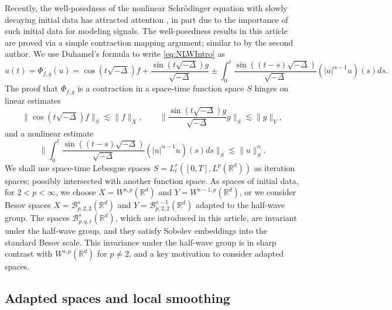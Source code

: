 \documentclass{amsart}
\theoremstyle{definition}
\newcommand{\R}{\mathbb{R}}
\newcommand {\Rd}{\mathbb{R}^{d}}
\newcommand {\Baspqr}{\mathcal{B}^{s}_{p,q,r}(\Rd)}
\numberwithin{equation}{section}
\begin{document}
Recently, the well-posedness of the nonlinear Schr\"odinger equation with slowly decaying initial data has attracted attention \cite{DodsonSofferSpencer2021,Schippa2022}, in part due to the importance of such initial data for modeling signals. The well-posedness results in this article are proved via a simple contraction mapping argument; similar to \cite{Schippa2022} by the second author. We use Duhamel's formula to write \eqref{eq:NLWIntro} as
\[
u(t) = \Phi_{f,g}(u) = \cos(t \sqrt{- \Delta}) f + \frac{\sin(t \sqrt{- \Delta}) g}{\sqrt{- \Delta}} \pm \int_0^t \frac{\sin((t-s) \sqrt{- \Delta})}{\sqrt{- \Delta}} (|u|^{\alpha - 1} u)(s) ds.
\]
The proof that $\Phi_{f,g}$ is a contraction in a space-time function space $S$ hinges on linear estimates
\[
\| \cos(t \sqrt{- \Delta}) f \|_S \lesssim \| f \|_X , \qquad \Big\| \frac{\sin (t \sqrt{- \Delta}) g}{\sqrt{- \Delta}} g \Big\|_S \lesssim \| g \|_Y,
\]
and a nonlinear estimate
\[
\Big\| \int_0^t \frac{\sin((t-s) \sqrt{- \Delta})}{\sqrt{ - \Delta}} (|u|^{\alpha -1} u)(s) ds \Big\|_S \lesssim \| u \|_S^\alpha.
\]
We shall use space-time Lebesgue spaces $S = L_t^r([0,T],L^p(\R^d))$ as iteration spaces; possibly intersected with another function space. As spaces of initial data, for $2<p<\infty$, we choose $X = W^{s,p}(\R^d)$ and $Y = W^{s-1,p}(\R^d)$, or we consider Besov spaces $X = \mathcal{B}^{s}_{p,2,2}(\R^d)$ and $Y = \mathcal{B}^{s-1}_{p,2,2}(\R^d)$ adapted to the half-wave group. The spaces $\Baspqr$, which are introduced in this article, are invariant under the half-wave group, and they satisfy Sobolev embeddings into the standard Besov scale. This invariance under the half-wave group is in sharp contrast with $W^{s,p}(\Rd)$ for $p\neq 2$, and a key motivation to consider adapted spaces. 




\subsection*{Adapted spaces and local smoothing}
\end{document}
